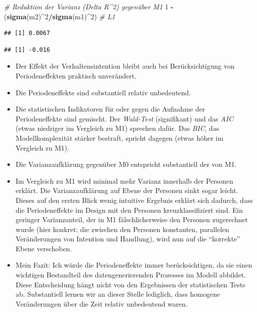 \documentclass[
]{book}
\newenvironment{Shaded}{\begin{snugshade}}{\end{snugshade}}
\newcommand{\CommentTok}[1]{\textcolor[rgb]{0.56,0.35,0.01}{\textit{#1}}}
\newcommand{\DecValTok}[1]{\textcolor[rgb]{0.00,0.00,0.81}{#1}}
\newcommand{\KeywordTok}[1]{\textcolor[rgb]{0.13,0.29,0.53}{\textbf{#1}}}
\newcommand{\NormalTok}[1]{#1}
\newcommand{\OperatorTok}[1]{\textcolor[rgb]{0.81,0.36,0.00}{\textbf{#1}}}
\newcommand{\StringTok}[1]{\textcolor[rgb]{0.31,0.60,0.02}{#1}}
\providecommand{\tightlist}{%
  \setlength{\itemsep}{0pt}\setlength{\parskip}{0pt}}
\begin{document}
\begin{Shaded}
\begin{Highlighting}[]
\CommentTok{# Reduktion der Varianz (Delta R^2) gegenüber M1}
\DecValTok{1} \OperatorTok{-}\StringTok{ }\NormalTok{(}\KeywordTok{sigma}\NormalTok{(m2)}\OperatorTok{^}\DecValTok{2}\OperatorTok{/}\KeywordTok{sigma}\NormalTok{(m1)}\OperatorTok{^}\DecValTok{2}\NormalTok{)  }\CommentTok{# L1}
\end{Highlighting}
\end{Shaded}

\begin{verbatim}
## [1] 0.0067
\end{verbatim}

\begin{Shaded}
\end{Shaded}

\begin{verbatim}
## [1] -0.016
\end{verbatim}

\begin{itemize}
\tightlist
\item
  Der Effekt der Verhaltensintention bleibt auch bei Berücksichtigung von Periodeneffekten praktisch unverändert.
\item
  Die Periodeneffekte sind substantiell relativ unbedeutend.
\item
  Die statistischen Indikatoren für oder gegen die Aufnahme der Periodeneffekte sind gemischt. Der \emph{Wald-Test} (signifikant) und das \emph{AIC} (etwas niedriger im Vergleich zu M1) sprechen dafür. Das \emph{BIC}, das Modellkomplexität stärker bestraft, spricht dagegen (etwas höher im Vergleich zu M1).
\item
  Die Varianzaufklärung gegenüber M0 entspricht substantiell der von M1.
\item
  Im Vergleich zu M1 wird minimal mehr Varianz innerhalb der Personen erklärt. Die Varianzaufklärung auf Ebene der Personen sinkt sogar leicht. Dieses auf den ersten Blick wenig intuitive Ergebnis erklärt sich dadurch, dass die Periodeneffekte im Design mit den Personen kreuzklassifiziert sind. Ein geringer Varianzanteil, der in M1 fälschlicherweise den Personen zugerechnet wurde (hier konkret: die zwischen den Personen konstanten, parallelen Veränderungen von Intention und Handlung), wird nun auf die ``korrekte'' Ebene verschoben.
\item
  Mein Fazit: Ich würde die Periodeneffekte immer berücksichtigen, da sie einen wichtigen Bestandteil des datengenerierenden Prozesses im Modell abbildet. Diese Entscheidung hängt nicht von den Ergebnissen der statistischen Tests ab. Substantiell lernen wir an dieser Stelle lediglich, dass homogene Veränderungen über die Zeit relativ unbedeutend waren.
\end{itemize}
\end{document}
